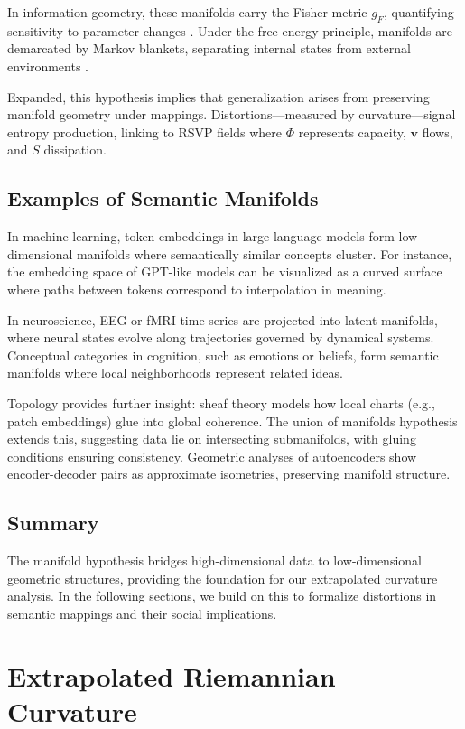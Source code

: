 \documentclass{article}
\theoremstyle{definition}
\begin{document}
In information geometry, these manifolds carry the Fisher metric $g_F$, quantifying sensitivity to parameter changes \cite{caticha2015geometry}. Under the free energy principle, manifolds are demarcated by Markov blankets, separating internal states from external environments \cite{kirchhoff2018markov}.

Expanded, this hypothesis implies that generalization arises from preserving manifold geometry under mappings. Distortions—measured by curvature—signal entropy production, linking to RSVP fields where $\Phi$ represents capacity, $\mathbf{v}$ flows, and $S$ dissipation.

\subsection{Examples of Semantic Manifolds}

In machine learning, token embeddings in large language models form low-dimensional manifolds where semantically similar concepts cluster. For instance, the embedding space of GPT-like models can be visualized as a curved surface where paths between tokens correspond to interpolation in meaning.

In neuroscience, EEG or fMRI time series are projected into latent manifolds, where neural states evolve along trajectories governed by dynamical systems. Conceptual categories in cognition, such as emotions or beliefs, form semantic manifolds where local neighborhoods represent related ideas.

Topology provides further insight: sheaf theory models how local charts (e.g., patch embeddings) glue into global coherence. The union of manifolds hypothesis \cite{brown2023union} extends this, suggesting data lie on intersecting submanifolds, with gluing conditions ensuring consistency. Geometric analyses of autoencoders \cite{lee2023geometric} show encoder-decoder pairs as approximate isometries, preserving manifold structure.

\subsection{Summary}

The manifold hypothesis bridges high-dimensional data to low-dimensional
geometric structures, providing the foundation for our extrapolated curvature
analysis. In the following sections, we build on this to formalize distortions
in semantic mappings and their social implications.

\section{Extrapolated Riemannian Curvature}
\end{document}

